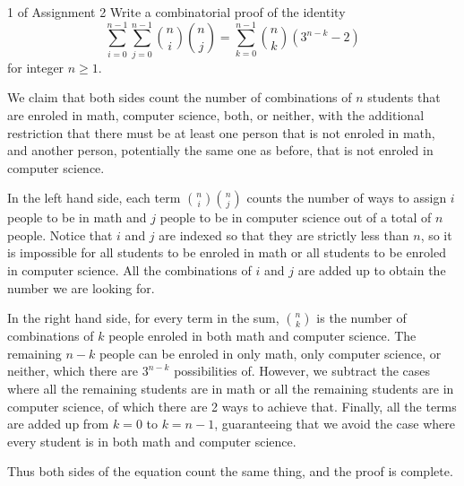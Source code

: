 \documentclass{eh-homework}
\begin{document}
    \begin{question}{1 of Assignment 2}
        Write a combinatorial proof of the identity
        \[
            \sum_{i=0}^{n-1}\sum_{j=0}^{n-1} \binom{n}{i} \binom{n}{j}
            = 
            \sum_{k=0}^{n-1} \binom{n}{k} \left(3^{n-k} - 2\right)
        \]
        for integer $n \geq 1$.

        \tcblower

        We claim that both sides count the number of combinations of \(n\) students that are enroled in math, computer science, both, or neither, with the additional restriction that there must be at least one person that is not enroled in math, and another person, potentially the same one as before, that is not enroled in computer science.

        \medskip

        In the left hand side, each term \(\binom{n}{i}\binom{n}{j}\) counts the number of ways to assign \(i\) people to be in math and \(j\) people to be in computer science out of a total of \(n\) people. Notice that \(i\) and \(j\) are indexed so that they are strictly less than \(n\), so it is impossible for all students to be enroled in math or all students to be enroled in computer science. All the combinations of \(i\) and \(j\) are added up to obtain the number we are looking for.

        \medskip

        In the right hand side, for every term in the sum, \(\binom{n}{k}\) is the number of combinations of \(k\) people enroled in both math and computer science. The remaining \(n - k\) people can be enroled in only math, only computer science, or neither, which there are \(3^{n-k}\) possibilities of. However, we subtract the cases where all the remaining students are in math or all the remaining students are in computer science, of which there are 2 ways to achieve that. Finally, all the terms are added up from \(k=0\) to \(k=n-1\), guaranteeing that we avoid the case where every student is in both math and computer science.

        \medskip

        Thus both sides of the equation count the same thing, and the proof is complete.
    \end{question}
    \pagebreak
\end{document}
